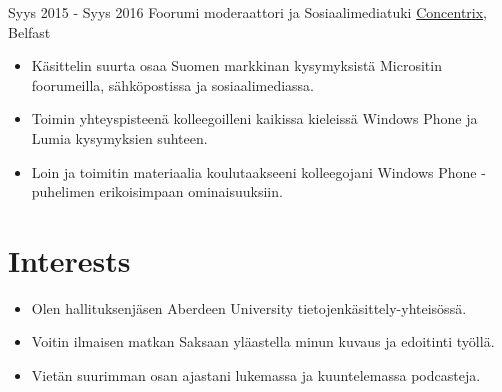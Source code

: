 \documentclass[letterpaper]{twentysecondcvfi} %
\begin{document}
\begin{twenty} %
     \twentyitem
   		{Syys 2015 -}
		{Syys 2016}
        {Foorumi moderaattori ja Sosiaalimediatuki}
        {\href{https://www.concentrix.com/}{Concentrix}, Belfast}
        {}
        {
        \begin{itemize}
        \item Käsittelin suurta osaa Suomen markkinan kysymyksistä Micrositin foorumeilla, sähköpostissa ja sosiaalimediassa.
        \item Toimin yhteyspisteenä kolleegoilleni kaikissa kieleissä Windows Phone ja Lumia kysymyksien suhteen.
        \item Loin ja toimitin materiaalia koulutaakseeni kolleegojani Windows Phone -puhelimen erikoisimpaan ominaisuuksiin.
    \end{itemize}
    	}

\end{twenty}


\section{Interests}
    \begin{itemize}
        \item Olen hallituksenjäsen Aberdeen University tietojenkäsittely-yhteisössä.
        \item Voitin ilmaisen matkan Saksaan yläastella minun kuvaus ja edoitinti työllä.
        \item Vietän suurimman osan ajastani lukemassa ja kuuntelemassa podcasteja.
    \end{itemize}
\end{document}
